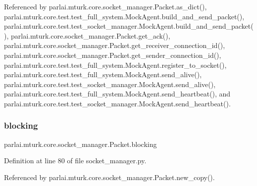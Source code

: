 Referenced by parlai.\+mturk.\+core.\+socket\+\_\+manager.\+Packet.\+as\+\_\+dict(), parlai.\+mturk.\+core.\+test.\+test\+\_\+full\+\_\+system.\+Mock\+Agent.\+build\+\_\+and\+\_\+send\+\_\+packet(), parlai.\+mturk.\+core.\+test.\+test\+\_\+socket\+\_\+manager.\+Mock\+Agent.\+build\+\_\+and\+\_\+send\+\_\+packet(), parlai.\+mturk.\+core.\+socket\+\_\+manager.\+Packet.\+get\+\_\+ack(), parlai.\+mturk.\+core.\+socket\+\_\+manager.\+Packet.\+get\+\_\+receiver\+\_\+connection\+\_\+id(), parlai.\+mturk.\+core.\+socket\+\_\+manager.\+Packet.\+get\+\_\+sender\+\_\+connection\+\_\+id(), parlai.\+mturk.\+core.\+test.\+test\+\_\+full\+\_\+system.\+Mock\+Agent.\+register\+\_\+to\+\_\+socket(), parlai.\+mturk.\+core.\+test.\+test\+\_\+full\+\_\+system.\+Mock\+Agent.\+send\+\_\+alive(), parlai.\+mturk.\+core.\+test.\+test\+\_\+socket\+\_\+manager.\+Mock\+Agent.\+send\+\_\+alive(), parlai.\+mturk.\+core.\+test.\+test\+\_\+full\+\_\+system.\+Mock\+Agent.\+send\+\_\+heartbeat(), and parlai.\+mturk.\+core.\+test.\+test\+\_\+socket\+\_\+manager.\+Mock\+Agent.\+send\+\_\+heartbeat().

\mbox{\label{classparlai_1_1mturk_1_1core_1_1socket__manager_1_1Packet_ace59fc70911f5349259a6e09541ef776}} 
\subsubsection{\texorpdfstring{blocking}{blocking}}
{\footnotesize\ttfamily parlai.\+mturk.\+core.\+socket\+\_\+manager.\+Packet.\+blocking}



Definition at line 80 of file socket\+\_\+manager.\+py.



Referenced by parlai.\+mturk.\+core.\+socket\+\_\+manager.\+Packet.\+new\+\_\+copy().

\mbox{\label{classparlai_1_1mturk_1_1core_1_1socket__manager_1_1Packet_a1131b2ba6f1534a3edd9f704ae5db107}} 
